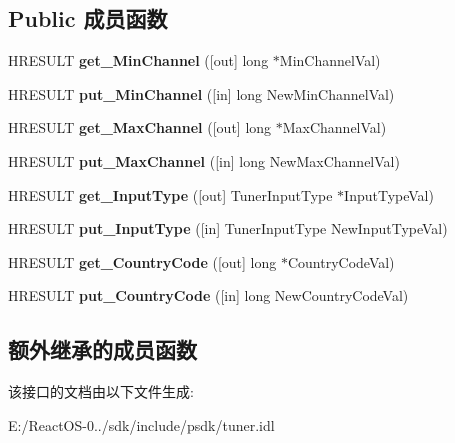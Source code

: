 \subsection*{Public 成员函数}
\begin{DoxyCompactItemize}
\item 
\mbox{\label{interface_i_analog_t_v_tuning_space_a1b964151cd9613152d2732c61123f0b3}} 
H\+R\+E\+S\+U\+LT {\bfseries get\+\_\+\+Min\+Channel} (\mbox{[}out\mbox{]} long $\ast$Min\+Channel\+Val)
\item 
\mbox{\label{interface_i_analog_t_v_tuning_space_ae3b240cc00bbf4a81cc642ef3f33e4f9}} 
H\+R\+E\+S\+U\+LT {\bfseries put\+\_\+\+Min\+Channel} (\mbox{[}in\mbox{]} long New\+Min\+Channel\+Val)
\item 
\mbox{\label{interface_i_analog_t_v_tuning_space_a80d42af9c63831d7ff6c7a383c4b2e3b}} 
H\+R\+E\+S\+U\+LT {\bfseries get\+\_\+\+Max\+Channel} (\mbox{[}out\mbox{]} long $\ast$Max\+Channel\+Val)
\item 
\mbox{\label{interface_i_analog_t_v_tuning_space_a27e28fbb10bac862212cbf46c79d77e6}} 
H\+R\+E\+S\+U\+LT {\bfseries put\+\_\+\+Max\+Channel} (\mbox{[}in\mbox{]} long New\+Max\+Channel\+Val)
\item 
\mbox{\label{interface_i_analog_t_v_tuning_space_a4e7abbb76bd53403689e151996a7a91f}} 
H\+R\+E\+S\+U\+LT {\bfseries get\+\_\+\+Input\+Type} (\mbox{[}out\mbox{]} Tuner\+Input\+Type $\ast$Input\+Type\+Val)
\item 
\mbox{\label{interface_i_analog_t_v_tuning_space_a4deef36edf6b85e4aed68c08af256d97}} 
H\+R\+E\+S\+U\+LT {\bfseries put\+\_\+\+Input\+Type} (\mbox{[}in\mbox{]} Tuner\+Input\+Type New\+Input\+Type\+Val)
\item 
\mbox{\label{interface_i_analog_t_v_tuning_space_a0b72d74e17809946a25a978ea4f45610}} 
H\+R\+E\+S\+U\+LT {\bfseries get\+\_\+\+Country\+Code} (\mbox{[}out\mbox{]} long $\ast$Country\+Code\+Val)
\item 
\mbox{\label{interface_i_analog_t_v_tuning_space_a0ee5b325b15f37b8ee84c4c488efd459}} 
H\+R\+E\+S\+U\+LT {\bfseries put\+\_\+\+Country\+Code} (\mbox{[}in\mbox{]} long New\+Country\+Code\+Val)
\end{DoxyCompactItemize}
\subsection*{额外继承的成员函数}


该接口的文档由以下文件生成\+:\begin{DoxyCompactItemize}
\item 
E\+:/\+React\+O\+S-\/0../sdk/include/psdk/tuner.\+idl\end{DoxyCompactItemize}
